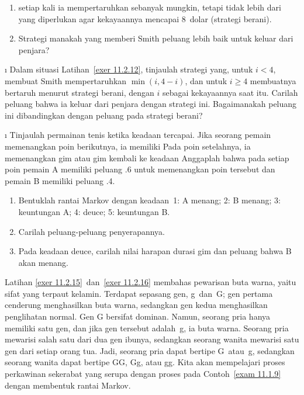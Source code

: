 \begin{LJSItem}
\begin{enumerate}
\item setiap kali ia mempertaruhkan sebanyak mungkin, tetapi tidak lebih dari
yang diperlukan agar kekayaannya mencapai 8~dolar (strategi berani).

\item Strategi manakah yang memberi Smith peluang lebih baik untuk keluar dari
penjara?
\end{enumerate}

\i\label{exer 11.2.13} Dalam situasi Latihan~\ref{exer 11.2.12}, tinjaulah
strategi yang, untuk $i < 4$, membuat Smith mempertaruhkan $\min(i,4 - i)$, dan
untuk $i \geq 4$ membuatnya bertaruh menurut strategi berani, dengan $i$ sebagai
kekayaannya saat itu. Carilah peluang bahwa ia keluar dari penjara dengan
strategi ini. Bagaimanakah peluang ini dibandingkan dengan peluang pada strategi
berani?

\i\label{exer 11.2.14} Tinjaulah permainan tenis ketika keadaan
 tercapai. Jika seorang pemain memenangkan poin berikutnya, ia
memiliki  Pada poin setelahnya, ia memenangkan gim atau gim
kembali ke keadaan  Anggaplah bahwa pada setiap poin pemain A
memiliki peluang .6 untuk memenangkan poin tersebut dan pemain B memiliki
peluang .4.
\begin{enumerate}
\item Bentuklah rantai Markov dengan keadaan~1: A menang; 2: B menang; 3:
keuntungan A; 4: deuce; 5: keuntungan B.

\item Carilah peluang-peluang penyerapannya.

\item Pada keadaan deuce, carilah nilai harapan durasi gim dan peluang bahwa B
akan menang.
\end{enumerate}

\medbreak
Latihan \ref{exer 11.2.15}~dan~\ref{exer 11.2.16} membahas pewarisan buta
warna, yaitu sifat yang terpaut kelamin. Terdapat sepasang gen,
g~dan~G; gen pertama cenderung menghasilkan buta warna, sedangkan gen kedua
menghasilkan penglihatan normal. Gen G bersifat dominan. Namun, seorang pria
hanya memiliki satu gen, dan jika gen tersebut adalah~g, ia buta warna. Seorang
pria mewarisi salah satu dari dua gen ibunya, sedangkan seorang wanita mewarisi
satu gen dari setiap orang tua. Jadi, seorang pria dapat bertipe G~atau~g,
sedangkan seorang wanita dapat bertipe GG, Gg, atau gg. Kita akan mempelajari
proses perkawinan sekerabat yang serupa dengan proses pada
Contoh~\ref{exam 11.1.9} dengan membentuk rantai Markov.


\end{LJSItem}
